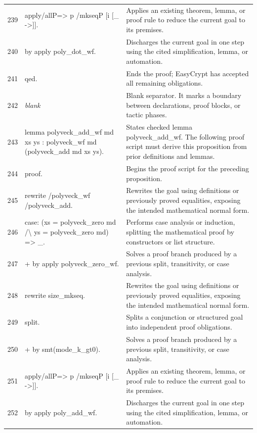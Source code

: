 \documentclass[10pt]{article}
\begin{document}
\begin{longtable}{r L{0.53\textwidth} L{0.37\textwidth}}
239 & {\ttfamily\scriptsize apply/allP=> p /mkseqP [i [\_ ->]].} & Applies an existing theorem, lemma, or proof rule to reduce the current goal to its premises. \\
240 & {\ttfamily\scriptsize by apply poly\_dot\_wf.} & Discharges the current goal in one step using the cited simplification, lemma, or automation. \\
241 & {\ttfamily\scriptsize qed.} & Ends the proof; EasyCrypt has accepted all remaining obligations. \\
242 & {\ttfamily\scriptsize \emph{blank}} & Blank separator.  It marks a boundary between declarations, proof blocks, or tactic phases. \\
243 & {\ttfamily\scriptsize lemma polyveck\_add\_wf md xs ys : polyveck\_wf md (polyveck\_add md xs ys).} & States checked lemma polyveck\_add\_wf.  The following proof script must derive this proposition from prior definitions and lemmas. \\
244 & {\ttfamily\scriptsize proof.} & Begins the proof script for the preceding proposition. \\
245 & {\ttfamily\scriptsize rewrite /polyveck\_wf /polyveck\_add.} & Rewrites the goal using definitions or previously proved equalities, exposing the intended mathematical normal form. \\
246 & {\ttfamily\scriptsize case: (xs = polyveck\_zero md /\textbackslash{} ys = polyveck\_zero md) => \_.} & Performs case analysis or induction, splitting the mathematical proof by constructors or list structure. \\
247 & {\ttfamily\scriptsize + by apply polyveck\_zero\_wf.} & Solves a proof branch produced by a previous split, transitivity, or case analysis. \\
248 & {\ttfamily\scriptsize rewrite size\_mkseq.} & Rewrites the goal using definitions or previously proved equalities, exposing the intended mathematical normal form. \\
249 & {\ttfamily\scriptsize split.} & Splits a conjunction or structured goal into independent proof obligations. \\
250 & {\ttfamily\scriptsize + by smt(mode\_k\_gt0).} & Solves a proof branch produced by a previous split, transitivity, or case analysis. \\
251 & {\ttfamily\scriptsize apply/allP=> p /mkseqP [i [\_ ->]].} & Applies an existing theorem, lemma, or proof rule to reduce the current goal to its premises. \\
252 & {\ttfamily\scriptsize by apply poly\_add\_wf.} & Discharges the current goal in one step using the cited simplification, lemma, or automation. \\

\end{longtable}
\end{document}

